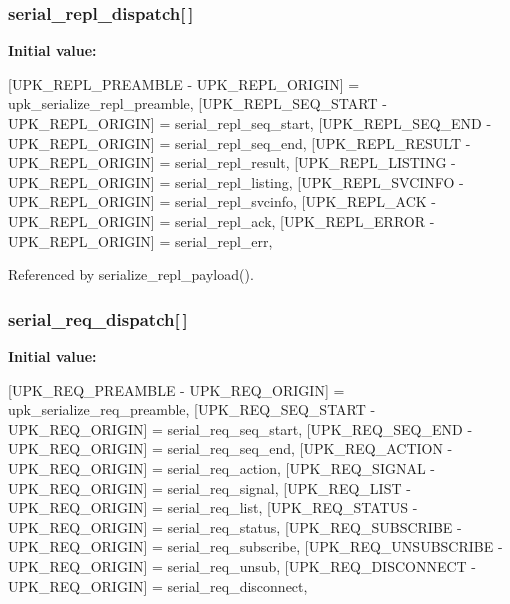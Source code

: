 \subsubsection[{serial\_\-repl\_\-dispatch}]{ {\bf serial\_\-repl\_\-dispatch}[$\,$]\hspace{0.3cm}{\ttfamily  [static]}}\label{upk__v0__protocol__serializer_8c_a8ac8faf1c7767fa5373b1857d3de9e02}
{\bfseries Initial value:}
\begin{DoxyCode}
 {
    [UPK_REPL_PREAMBLE - UPK_REPL_ORIGIN] = upk_serialize_repl_preamble,
    [UPK_REPL_SEQ_START - UPK_REPL_ORIGIN] = serial_repl_seq_start,
    [UPK_REPL_SEQ_END - UPK_REPL_ORIGIN] = serial_repl_seq_end,
    [UPK_REPL_RESULT - UPK_REPL_ORIGIN] = serial_repl_result,
    [UPK_REPL_LISTING - UPK_REPL_ORIGIN] = serial_repl_listing,
    [UPK_REPL_SVCINFO - UPK_REPL_ORIGIN] = serial_repl_svcinfo,
    [UPK_REPL_ACK - UPK_REPL_ORIGIN] = serial_repl_ack,
    [UPK_REPL_ERROR - UPK_REPL_ORIGIN] = serial_repl_err,
}
\end{DoxyCode}


Referenced by serialize\_\-repl\_\-payload().

\subsubsection[{serial\_\-req\_\-dispatch}]{ {\bf serial\_\-req\_\-dispatch}[$\,$]\hspace{0.3cm}{\ttfamily  [static]}}\label{upk__v0__protocol__serializer_8c_a033ee00f99796af241b31067b169e33f}
{\bfseries Initial value:}
\begin{DoxyCode}
 {
    [UPK_REQ_PREAMBLE - UPK_REQ_ORIGIN] = upk_serialize_req_preamble,
    [UPK_REQ_SEQ_START - UPK_REQ_ORIGIN] = serial_req_seq_start,
    [UPK_REQ_SEQ_END - UPK_REQ_ORIGIN] = serial_req_seq_end,
    [UPK_REQ_ACTION - UPK_REQ_ORIGIN] = serial_req_action,
    [UPK_REQ_SIGNAL - UPK_REQ_ORIGIN] = serial_req_signal,
    [UPK_REQ_LIST - UPK_REQ_ORIGIN] = serial_req_list,
    [UPK_REQ_STATUS - UPK_REQ_ORIGIN] = serial_req_status,
    [UPK_REQ_SUBSCRIBE - UPK_REQ_ORIGIN] = serial_req_subscribe,
    [UPK_REQ_UNSUBSCRIBE - UPK_REQ_ORIGIN] = serial_req_unsub,
    [UPK_REQ_DISCONNECT - UPK_REQ_ORIGIN] = serial_req_disconnect,
}
\end{DoxyCode}


